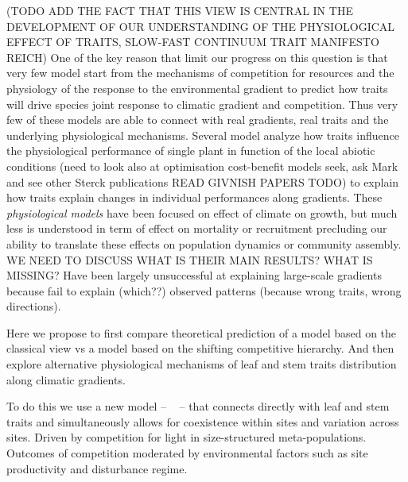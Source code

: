 \documentclass[a4paper,11pt]{article}
\begin{document}
(TODO ADD THE FACT THAT THIS VIEW IS CENTRAL IN THE DEVELOPMENT OF OUR UNDERSTANDING OF THE PHYSIOLOGICAL EFFECT OF TRAITS, SLOW-FAST CONTINUUM TRAIT MANIFESTO REICH)
One of the key reason that limit our progress on this question is that very few model start from the mechanisms of competition for resources and the physiology of the response to the environmental gradient to predict how traits will drive species joint response to climatic gradient and competition. Thus very few of these models are able to connect with real gradients,
real traits and the underlying physiological mechanisms. Several model
analyze how traits influence the physiological performance of single
plant in function of the local abiotic conditions \citep{Sterck-2011}
(need to look also at optimisation cost-benefit models seek, ask Mark
and see other Sterck publications READ GIVNISH PAPERS TODO) to explain how traits explain changes in individual performances along gradients. These \textit{physiological models} have been focused on effect of climate on growth, but much less is understood in term of effect on mortality or recruitment precluding our ability to translate these effects on population dynamics or community assembly. 
WE NEED TO DISCUSS \citep{Sakschewski-2015,Scheiter-2013} WHAT IS THEIR MAIN RESULTS? WHAT IS MISSING?
Have been largely unsuccessful at explaining large-scale gradients because fail to explain (which??) observed patterns (because wrong traits, wrong directions).

Here we propose to first compare theoretical prediction of a model based on the classical view vs a model based on the shifting competitive hierarchy. And then explore alternative physiological mechanisms of leaf and stem traits distribution along climatic gradients.

To do this we use a new model -- \plant\ \citep{Falster-2016} -- that connects directly with leaf and stem traits and simultaneously allows for coexistence within sites and variation across sites.  Driven by competition for light in size-structured meta-populations. Outcomes of competition moderated by environmental factors such as site productivity and disturbance regime.
\end{document}
